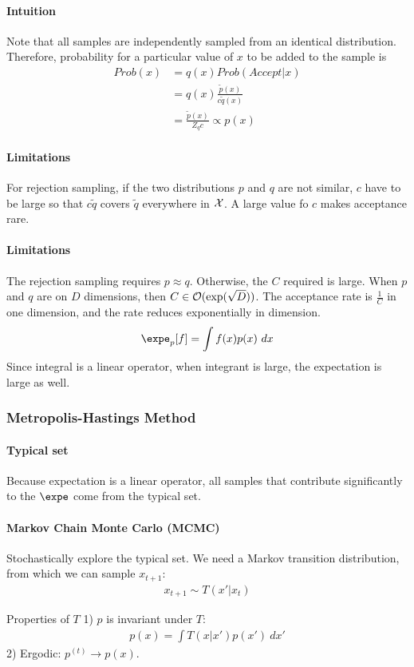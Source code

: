 \documentclass{article}
\begin{document}
	\paragraph{Intuition} Note that all samples are independently sampled from an identical distribution. Therefore, probability for a particular value of $x$ to be added to the sample is
	\begin{align}
		Prob(x) &= q(x) Prob(Accept|x) \\
		&= q(x) \frac{\tilde{p}(x)}{c \tilde{q}(x)} \\
		&= \frac{\tilde{p}(x)}{Z_q c} \propto p(x)
	\end{align}
	
	\paragraph{Limitations} For rejection sampling, if the two distributions $p$ and $q$ are not similar, $c$ have to be large so that $c \tilde{q}$ covers $\tilde{q}$ everywhere in $\mathcal{{X}}$. A large value fo $c$ makes acceptance rare.
	
	\paragraph{Limitations} The rejection sampling requires $p \approx q$. Otherwise, the $C$ required is large. When $p$ and $q$ are on $D$ dimensions, then $C \in \mathcal{{O}}(\exp(\sqrt{D}))$. The acceptance rate is $\frac{1}{C}$ in one dimension, and the rate reduces exponentially in dimension.
	\begin{align}
		\expe_p [f] = \int f(x) p(x)\ dx
	\end{align}
	Since integral is a linear operator, when integrant is large, the expectation is large as well.
	
	\subsubsection{Metropolis-Hastings Method}
	\paragraph{Typical set} Because expectation is a linear operator, all samples that contribute significantly to the $\expe$ come from the typical set. 

	\paragraph{Markov Chain Monte Carlo (MCMC)} Stochastically explore the typical set. We need a Markov transition distribution, from which we can sample $x_{t+1}$:
	\begin{align}
		x_{t+1} \sim T(x'|x_t)
	\end{align}
	\begin{proposition} Properties of $T$
		1) $p$ is invariant under $T$:
		\begin{align}
			p(x) = \int T(x|x') p(x')\ dx'
		\end{align}
		2) Ergodic: $p^{(t)} \to p(x)$.
	\end{proposition}
	
\end{document}
